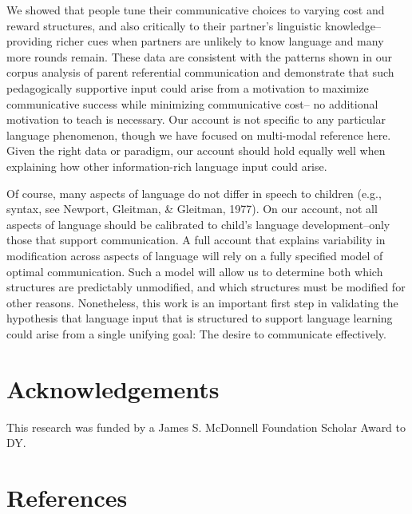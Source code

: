 \documentclass[10pt, letterpaper]{article}
\begin{document}
We showed that people tune their communicative choices to varying cost
and reward structures, and also critically to their partner's linguistic
knowledge--providing richer cues when partners are unlikely to know
language and many more rounds remain. These data are consistent with the
patterns shown in our corpus analysis of parent referential
communication and demonstrate that such pedagogically supportive input
could arise from a motivation to maximize communicative success while
minimizing communicative cost-- no additional motivation to teach is
necessary. Our account is not specific to any particular language
phenomenon, though we have focused on multi-modal reference here. Given
the right data or paradigm, our account should hold equally well when
explaining how other information-rich language input could arise.

Of course, many aspects of language do not differ in speech to children
(e.g., syntax, see Newport, Gleitman, \& Gleitman, 1977). On our
account, not all aspects of language should be calibrated to child's
language development--only those that support communication. A full
account that explains variability in modification across aspects of
language will rely on a fully specified model of optimal communication.
Such a model will allow us to determine both which structures are
predictably unmodified, and which structures must be modified for other
reasons. Nonetheless, this work is an important first step in validating
the hypothesis that language input that is structured to support
language learning could arise from a single unifying goal: The desire to
communicate effectively.

\vspace{1em}

\section{Acknowledgements}\label{acknowledgements}

This research was funded by a James S. McDonnell Foundation Scholar
Award to DY.

\section{References}\label{references}
\end{document}

